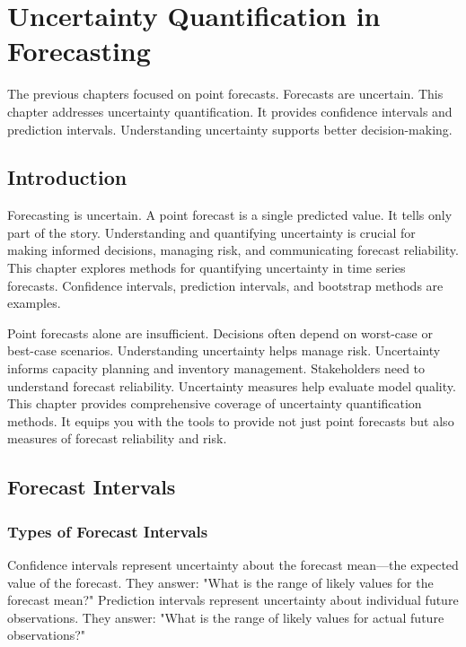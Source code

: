 \chapter{Uncertainty Quantification in Forecasting}

The previous chapters focused on point forecasts. Forecasts are uncertain. This chapter addresses uncertainty quantification. It provides confidence intervals and prediction intervals. Understanding uncertainty supports better decision-making.

\section{Introduction}

Forecasting is uncertain. A point forecast is a single predicted value. It tells only part of the story. Understanding and quantifying uncertainty is crucial for making informed decisions, managing risk, and communicating forecast reliability. This chapter explores methods for quantifying uncertainty in time series forecasts. Confidence intervals, prediction intervals, and bootstrap methods are examples.

Point forecasts alone are insufficient. Decisions often depend on worst-case or best-case scenarios. Understanding uncertainty helps manage risk. Uncertainty informs capacity planning and inventory management. Stakeholders need to understand forecast reliability. Uncertainty measures help evaluate model quality. This chapter provides comprehensive coverage of uncertainty quantification methods. It equips you with the tools to provide not just point forecasts but also measures of forecast reliability and risk.

\section{Forecast Intervals}

\subsection{Types of Forecast Intervals}

Confidence intervals represent uncertainty about the forecast mean—the expected value of the forecast. They answer: "What is the range of likely values for the forecast mean?" Prediction intervals represent uncertainty about individual future observations. They answer: "What is the range of likely values for actual future observations?"

